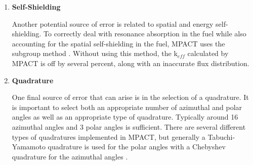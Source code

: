 \begin{enumerate}[leftmargin=*]
  \item \textbf{Self-Shielding}
  
  Another potential source of error is related to spatial and energy self-shielding.  To correctly deal with resonance absorption in the fuel while also accounting for the spatial self-shielding in the fuel, MPACT uses the subgroup method \cite{SubgroupOrig1974,SelfShieldingMethodologyMPACT2013}.  Without using this method, the k$_{eff}$ calculated by MPACT is off by several percent, along with an inaccurate flux distribution.
  
  \item \textbf{Quadrature}
  
  One final source of error that can arise is in the selection of a quadrature.  It is important to select both an appropriate number of azimuthal and polar angles as well as an appropriate type of quadrature.  Typically around 16 azimuthal angles and 3 polar angles is sufficient.  There are several different types of quadratures implemented in MPACT, but generally a Tabuchi-Yamamoto quadrature is used for the polar angles \cite{YamamotoQuadrature2012} with a Chebyshev quadrature for the azimuthal angles \cite{HandbookOfMathFunctions1972}.
\end{enumerate}